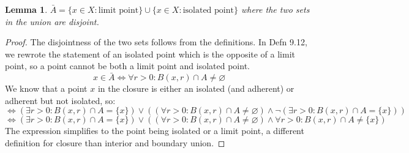 \documentclass{article}
\newtheorem{lem}{Lemma}[section]
\begin{document}
\medskip
\begin{lem}
$\bar{A} = \{x \in X: \text{limit point}\} \cup \{x \in X: \text{isolated point}\}$ where the two sets in the union are disjoint.
\end{lem}
\begin{proof}
The disjointness of the two sets follows from the definitions. In Defn 9.12, we rewrote the statement of an isolated point which is the opposite of a limit point, so a point cannot be both a limit point and isolated point.
\begin{equation*}
    x \in \bar{A} \iff \forall r > 0: B(x, r) \cap A \neq \varnothing
\end{equation*}
We know that a point $x$ in the closure is either an isolated (and adherent) or adherent but not isolated, so:
\begin{equation*}
    \iff (\exists r > 0: B(x, r) \cap A = \{x\}) \lor ((\forall r > 0: B(x, r) \cap A \neq \varnothing) \land \lnot(\exists r > 0: B(x, r) \cap A = \{x\}))
\end{equation*}
\begin{equation*}
    \iff (\exists r > 0: B(x, r) \cap A = \{x\}) \lor ((\forall r > 0: B(x, r) \cap A \neq \varnothing) \land \forall r > 0: B(x, r) \cap A \neq \{x\})
\end{equation*}
The expression simplifies to the point being isolated or a limit point, a different definition for closure than interior and boundary union.
\end{proof}

\medskip
\end{document}
